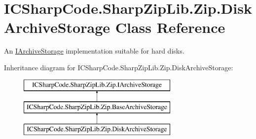 \hypertarget{class_i_c_sharp_code_1_1_sharp_zip_lib_1_1_zip_1_1_disk_archive_storage}{}\section{I\+C\+Sharp\+Code.\+Sharp\+Zip\+Lib.\+Zip.\+Disk\+Archive\+Storage Class Reference}
\label{class_i_c_sharp_code_1_1_sharp_zip_lib_1_1_zip_1_1_disk_archive_storage}


An \hyperlink{interface_i_c_sharp_code_1_1_sharp_zip_lib_1_1_zip_1_1_i_archive_storage}{I\+Archive\+Storage} implementation suitable for hard disks.  


Inheritance diagram for I\+C\+Sharp\+Code.\+Sharp\+Zip\+Lib.\+Zip.\+Disk\+Archive\+Storage\+:\begin{figure}[H]
\begin{center}
\leavevmode
\includegraphics[height=3.000000cm]{class_i_c_sharp_code_1_1_sharp_zip_lib_1_1_zip_1_1_disk_archive_storage}
\end{center}
\end{figure}

